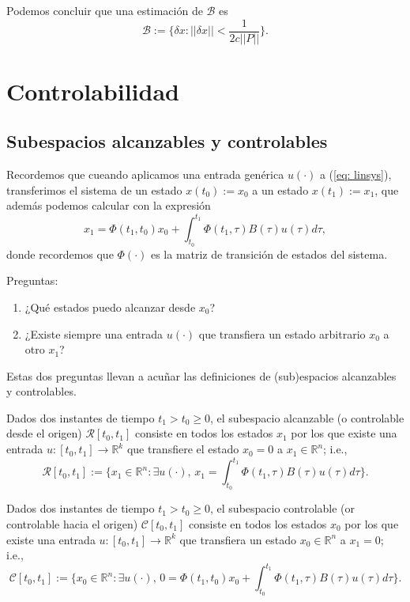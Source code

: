 Podemos concluir que una estimación de $\mathcal B$ es
\begin{equation}
	\mathcal{B} := \{ \delta x : ||\delta x|| < \frac{1}{2c||P||} \}.
	\label{eq: Bregion}
\end{equation}

\section{Controlabilidad}
\subsection{Subespacios alcanzables y controlables}
Recordemos que cueando aplicamos una entrada genérica $u(\cdot)$ a (\ref{eq: linsys}), transferimos el sistema de un estado $x(t_0):=x_0$ a un estado $x(t_1):=x_1$, que además podemos calcular con la expresión
\begin{equation}
	x_1 = \Phi(t_1,t_0)x_0 + \int_{t_0}^{t_1} \Phi(t_1,\tau)B(\tau)u(\tau)d\tau,
\end{equation}
donde recordemos que $\Phi(\cdot)$ es la matriz de transición de estados del sistema.

Preguntas:
\begin{enumerate}
	\item ¿Qué estados puedo alcanzar desde $x_0$?
	\item ¿Existe siempre una entrada $u(\cdot)$ que transfiera un estado arbitrario $x_0$ a otro $x_1$?
\end{enumerate}

Estas dos preguntas llevan a acuñar las definiciones de (sub)espacios alcanzables y controlables.

\begin{definition}
	Dados dos instantes de tiempo $t_1>t_0\geq 0$, el subespacio alcanzable (o controlable desde el origen) $\mathcal{R}[t_0,t_1]$ consiste en todos los estados $x_1$ por los que existe una entrada $u:[t_0,t_1]\to \mathbb{R}^k$ que transfiere el estado $x_0 = 0$ a  $x_1 \in\mathbb{R}^n$; i.e.,
	\begin{equation}
		\mathcal{R}[t_0,t_1] := \Big\{x_1\in\mathbb{R}^n : \exists u(\cdot),\, x_1 = \int_{t_0}^{t_1} \Phi(t_1,\tau)B(\tau)u(\tau)d\tau \Big\}. \label{eq: rs}
	\end{equation}
\end{definition}

\begin{definition}
	Dados dos instantes de tiempo $t_1>t_0\geq 0$, el subespacio controlable (or controlable hacia el origen) $\mathcal{C}[t_0,t_1]$ consiste en todos los estados $x_0$ por los que existe una entrada $u:[t_0,t_1]\to \mathbb{R}^k$ que transfiera un estado $x_0\in\mathbb{R}^n$ a $x_1 = 0$; i.e.,
	\begin{equation}
		\mathcal{C}[t_0,t_1] := \Big\{x_0\in\mathbb{R}^n : \exists u(\cdot),\, 0 = \Phi(t_1,t_0)x_0 + \int_{t_0}^{t_1} \Phi(t_1,\tau)B(\tau)u(\tau)d\tau \Big\}.
	\end{equation}
\end{definition}


